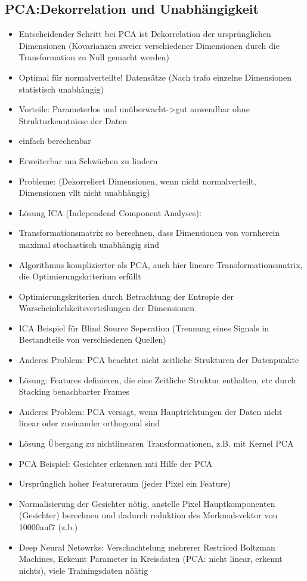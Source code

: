 \documentclass[a4paper,10pt,oneside]{article}
\begin{document}
\subsection{PCA:Dekorrelation und Unabhängigkeit}
\begin{itemize}
	\item Entscheidender Schritt bei PCA ist Dekorrelation der ursprünglichen Dimensionen (Kovarianzen zweier verschiedener Dimensionen durch die Transformation zu Null gemacht werden)
	\item Optimal für normalverteilte! Datensätze (Nach trafo einzelne Dimensionen statistisch unabhängig)
	\item Vorteile: Parameterlos und unüberwacht->gut anwendbar ohne Strukturkenntnisse der Daten
	\item einfach berechenbar
	\item Erweiterbar um Schwächen zu lindern
	\item Probleme: (Dekorreliert Dimensionen, wenn nicht normalverteilt, Dimensionen vllt nicht unabhängig)
	\item Lösung ICA (Independend Component Analyses):
	\item Transformationsmatrix so berechnen, dass Dimensionen von vornherein maximal stochastisch unabhängig sind
	\item Algorithmus komplizierter als PCA, auch hier lineare Transformationsmatrix, die Optimierungskriterium erfüllt
	\item Optimierungskriterien durch Betrachtung der Entropie der Warscheinlichkeitsverteilungen der Dimensionen
	\item ICA Beispiel für Blind Source Seperation (Trennung eines Signals in Bestandteile von verschiedenen Quellen)
	\item Anderes Problem: PCA beachtet nicht zeitliche Strukturen der Datenpunkte
	\item Lösung: Features definieren, die eine Zeitliche Struktur enthalten, etc durch Stacking benachbarter Frames
	\item Anderes Problem: PCA versagt, wenn Hauptrichtungen der Daten nicht linear oder zueinander orthogonal sind
	\item Lösung Übergang zu nichtlinearen Transformationen, z.B. mit Kernel PCA
	\item PCA Beispiel: Gesichter erkennen mti Hilfe der PCA
	\item Ursprünglich hoher Featureraum (jeder Pixel ein Feature)
	\item Normalisierung der Gesichter nötig, anstelle Pixel Hauptkomponenten (Gesichter) berechnen und dadurch reduktion des Merkmalsvektor von 10000auf7 (z.b.)
	\item Deep Neural Netowrks: Verschachtelung mehrerer Restriced Boltzman Machines, Erkennt Parameter in Kreisdaten (PCA: nicht linear, erkennt nichts), viele Trainingsdaten nöätig
\end{itemize}
\end{document}
